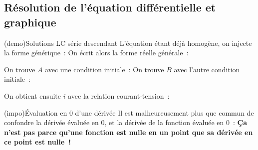 \documentclass[../../main/main.tex]{subfiles}
\begin{document}
\subsection{Résolution de l'équation différentielle et graphique}
\begin{tcb*}[label=demo:rcsolu](demo){Solutions LC série descendant}
	L'équation étant déjà homogène, on injecte la forme générique~:
	\psw{%
		\[
			u_C(t) = K \exr^{rt}
			\Ra
			r^2 \times \cancel{K \exr^{rt}} + \w_0{}^2\cancel{K\exr^{rt}} = 0
			\Lra
			r_{\pm} = \pm \jw_0
		\]
	}%
	On écrit alors la forme réelle générale~:
	\psw{%
		\[
			u_C(t) = A\cos(\w_0 t) + B\sin(\w_0 t)
		\]
	}%
	\vspace{-15pt}
	\begin{isd}[interior hidden, sidebyside align=top]
		On trouve $A$ avec une condition initiale~:
		\psw{%
			\[
				u_C(0) = A\cos(0) + B\sin(0) = A
				\\\Lra
				\boxed{A = E}
			\]
		}%
		\tcblower
		On trouve $B$ avec l'autre condition initiale~:
		\vspace{-15pt}
	\end{isd}
	\smallbreak
	On obtient ensuite $i$ avec la relation courant-tension~:
	\psw{%
		\[
			i(t) = C \dv{u_C}{t} = -CE \w_0 \sin(\w_0t)
		\]
	}%
	\vspace{-15pt}
\end{tcb*}

\begin{tcb*}(impo){Évaluation en 0 d'une dérivée}
	Il est malheureusement plus que commun de confondre la dérivée évaluée en 0,
	et la dérivée de la fonction évaluée en 0~:
	\textbf{Ça n'est pas parce qu'une fonction est nulle en un point que sa
		dérivée en ce point est nulle~!}
\end{tcb*}
\end{document}
